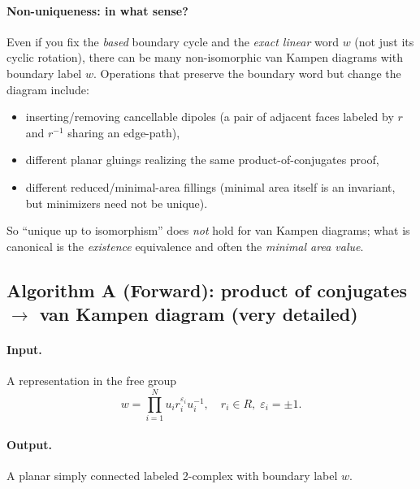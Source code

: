 \documentclass[11pt]{article}
\theoremstyle{definition}
\theoremstyle{plain}
\theoremstyle{remark}
\begin{document}
\paragraph{Non-uniqueness: in what sense?}
Even if you fix the \emph{based} boundary cycle and the \emph{exact linear} word $w$ (not just its cyclic rotation),
there can be many non-isomorphic van Kampen diagrams with boundary label $w$.
Operations that preserve the boundary word but change the diagram include:
\begin{itemize}[leftmargin=2em]
\item inserting/removing cancellable dipoles (a pair of adjacent faces labeled by $r$ and $r^{-1}$ sharing an edge-path),
\item different planar gluings realizing the same product-of-conjugates proof,
\item different reduced/minimal-area fillings (minimal area itself is an invariant, but minimizers need not be unique).
\end{itemize}
So ``unique up to isomorphism'' does \emph{not} hold for van Kampen diagrams; what is canonical is the \emph{existence} equivalence and often the \emph{minimal area value}.
\subsection*{Algorithm A (Forward): product of conjugates $\to$ van Kampen diagram (very detailed)}\cite{vanKampen1933,lyndonschupp1977}
\paragraph{Input.} A representation in the free group
\[
w=\prod_{i=1}^N u_i r_i^{\varepsilon_i}u_i^{-1},
\quad r_i\in R,\;\varepsilon_i=\pm 1.
\]
\paragraph{Output.} A planar simply connected labeled 2-complex with boundary label $w$.
\end{document}
